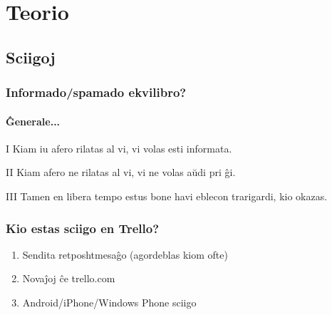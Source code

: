 \section{Teorio}

\subsection{Sciigoj}

  \begin{frame}
    \frametitle{Informado/spamado ekvilibro?}
	\framesubtitle{Ĝenerale...}	
	\pause
	\begin{block}{I}
		Kiam iu afero rilatas al vi, vi volas esti informata.
	\end{block}
	\pause
	\begin{block}{II}
		Kiam afero ne rilatas al vi, vi ne volas aŭdi pri ĝi.
	\end{block}
	\pause
	\begin{block}{III}
		Tamen en libera tempo estus bone havi eblecon trarigardi, kio okazas.
	\end{block}
	
  \end{frame}


  \begin{frame}
    \frametitle{Kio estas sciigo en Trello?}

	\begin{enumerate}
		\item Sendita retposhtmesaĝo (\alert{agordeblas kiom ofte})
		\item Novaĵoj ĉe trello.com
		\item Android/iPhone/Windows Phone sciigo
	\end{enumerate}
	
  \end{frame}



